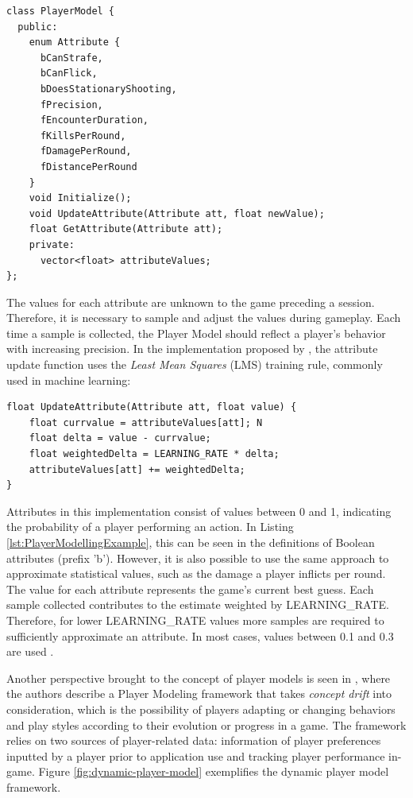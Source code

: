 \begin{lstlisting}[caption={Example of a Player Model for a shooter game.},label={lst:PlayerModellingExample}]
class PlayerModel {
  public:
    enum Attribute {
      bCanStrafe,
      bCanFlick,
      bDoesStationaryShooting,
      fPrecision,
      fEncounterDuration,
      fKillsPerRound,
      fDamagePerRound,
      fDistancePerRound
    }
    void Initialize();
    void UpdateAttribute(Attribute att, float newValue);
    float GetAttribute(Attribute att);
    private:
      vector<float> attributeValues;
};
\end{lstlisting}

The values for each attribute are unknown to the game preceding a session. Therefore, it is necessary to sample and adjust the values during gameplay. Each time a sample is collected, the Player Model should reflect a player's behavior with increasing precision. In the implementation proposed by \citet{BOOK_PlayerModeling}, the attribute update function uses the \emph{Least Mean Squares} (LMS) training rule, commonly used in machine learning:

\begin{lstlisting}[caption={Implementation of attribute update using least mean squares.},label={lst:AttributeUpdate}]
float UpdateAttribute(Attribute att, float value) {
    float currvalue = attributeValues[att]; N
    float delta = value - currvalue;
    float weightedDelta = LEARNING_RATE * delta;
    attributeValues[att] += weightedDelta;
}
\end{lstlisting}

Attributes in this implementation consist of values between 0 and 1, indicating the probability of a player performing an action. In Listing \ref{lst:PlayerModellingExample}, this can be seen in the definitions of Boolean attributes (prefix 'b'). However, it is also possible to use the same approach to approximate statistical values, such as the damage a player inflicts per round. The value for each attribute represents the game's current best guess. Each sample collected contributes to the estimate weighted by LEARNING\_RATE. Therefore, for lower LEARNING\_RATE values more samples are required to sufficiently approximate an attribute. In most cases, values between 0.1 and 0.3 are used \cite{BOOK_PlayerModeling}.

Another perspective brought to the concept of player models is seen in \cite{ARTICLE_DynamicPlayerModelling}, where the authors describe a Player Modeling framework that takes \emph{concept drift} into consideration, which is the possibility of players adapting or changing behaviors and play styles according to their evolution or progress in a game. The framework relies on two sources of player-related data: information of player preferences inputted by a player prior to application use and tracking player performance in-game. Figure \ref{fig:dynamic-player-model} exemplifies the dynamic player model framework.

